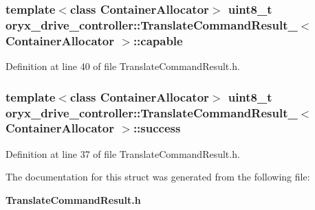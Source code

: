 \subsubsection[{capable}]{\setlength{\rightskip}{0pt plus 5cm}template$<$class \-Container\-Allocator$>$ uint8\-\_\-t {\bf oryx\-\_\-drive\-\_\-controller\-::\-Translate\-Command\-Result\-\_\-}$<$ \-Container\-Allocator $>$\-::{\bf capable}}\label{structoryx__drive__controller_1_1TranslateCommandResult___a68c8fa125650a10b0d21f9b61ee7d353}


\-Definition at line 40 of file \-Translate\-Command\-Result.\-h.

\subsubsection[{success}]{\setlength{\rightskip}{0pt plus 5cm}template$<$class \-Container\-Allocator$>$ uint8\-\_\-t {\bf oryx\-\_\-drive\-\_\-controller\-::\-Translate\-Command\-Result\-\_\-}$<$ \-Container\-Allocator $>$\-::{\bf success}}\label{structoryx__drive__controller_1_1TranslateCommandResult___a127b6ec70ff61b425f7754cd0aef311e}


\-Definition at line 37 of file \-Translate\-Command\-Result.\-h.



\-The documentation for this struct was generated from the following file\-:\begin{DoxyCompactItemize}
\item 
{\bf \-Translate\-Command\-Result.\-h}\end{DoxyCompactItemize}
